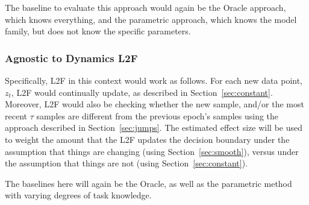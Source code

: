 \documentclass{article}
\begin{document}
The baseline to evaluate this approach would again be the Oracle approach, which knows everything, and the parametric approach, which knows the model family, but does not know the specific parameters. 

\subsubsection{Agnostic to Dynamics L2F}


Specifically, L2F in this context would work as follows.  For each new data point, $z_t$, L2F would continually update, as described in Section~\ref{sec:constant}.  Moreover, L2F would also be checking whether the new sample, and/or the most recent $\tau$ samples are different from the previous epoch's samples using the approach described in Section~\ref{sec:jumps}.  The estimated effect size will be used to weight the amount that the L2F updates the decision boundary under the assumption that things are changing (using Section~\ref{sec:smooth}), versus under the assumption that things are not (using Section~\ref{sec:constant}).  

The baselines here will again be the Oracle, as well as the parametric method with varying degrees of task knowledge. 
\end{document}
